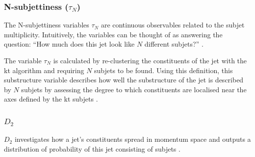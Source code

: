 \subsubsection{\texorpdfstring{N-subjettiness (${\tau}_{N}$)}{N-subjettiness tau 21)}}
The N-subjettiness variables $\tau_{N}$ are continuous observables related to the subjet multiplicity. Intuitively, the variables can be thought of as answering the question: “How much does this jet look like $N$ different subjets?” \cite{ccetin2012jet}.

The variable $\tau_{N}$ is calculated by re-clustering the constituents of the jet with the kt algorithm and requiring $N$ subjets to be found. Using this definition, this substructure variable describes how well the substructure of the jet is described by $N$ subjets by assessing the degree to which constituents are localised near the axes defined by the kt subjets \cite{ccetin2012jet}.
\subsubsection{\texorpdfstring{$D_2$}{$D_2$}}
$D_2$ investigates how a jet's constituents spread in momentum space and outputs a distribution of probability of this jet consisting of subjets \cite{lectured2}. 